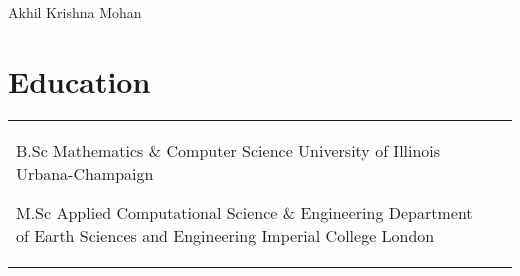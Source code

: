 \documentclass[10pt, oneside, openany]{article} %
\begin{document}

\begin{paracol}{2} %


\parbox[top][0.09\textheight][c]{\linewidth}{ %
	\vspace{-0.05\textheight} %
	\centering %
	{\sffamily\Huge Akhil Krishna Mohan}\\\medskip %
}



\section{Education} 





\begin{supertabular}{ll} %
	
	{B.Sc Mathematics \& Computer Science} %
	{} %
	{} %
	{University of Illinois Urbana-Champaign} %

	{M.Sc Applied Computational Science \& Engineering}
	{}
	{Department of Earth Sciences and Engineering}
	{Imperial College London}


\end{supertabular}
\end{paracol}
\end{document}
